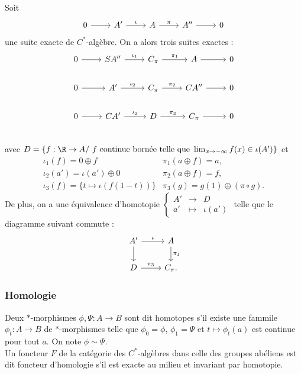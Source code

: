 \begin{lem}
Soit \[\begin{tikzcd}
0\arrow{r} & A' \arrow{r}{\iota} & A \arrow{r}{\pi} & A'' \arrow{r} & 0
\end{tikzcd}\]
une suite exacte de $C^*$-algèbre. On a alors trois suites exactes :
\[\begin{tikzcd}
0\arrow{r} & SA'' \arrow{r}{\iota_1} & C_\pi \arrow{r}{\pi_1} & A \arrow{r} & 0 \\
0\arrow{r} & A' \arrow{r}{\iota_2} & C_\pi \arrow{r}{\pi_2} & CA'' \arrow{r} & 0\\
0\arrow{r} & CA' \arrow{r}{\iota_3} & D \arrow{r}{\pi_3} & C_\pi \arrow{r} & 0\\
\end{tikzcd}\]
avec $D=\{f:\R\rightarrow A /\ f  \text{ continue bornée telle que }\lim_{x\rightarrow -\infty} f (x) \in \iota ( A')\}$ et 
\begin{align*}
\iota_1(f)=0\oplus f & \pi_1(a\oplus f) = a ,\\
\iota_2(a')=\iota(a')\oplus 0 & \pi_2(a\oplus f )=f,\\
\iota_3(f) = \{t\mapsto \iota(f(1-t))\} & \pi_3(g)=g(1)\oplus (\pi\circ g ) .
\end{align*}
De plus, on a une équivalence d'homotopie $\left\{\begin{array}{ccc} A' &\rightarrow& D\\ a' &\mapsto &\iota(a')\end{array}\right.$ telle que le diagramme suivant commute :
\[\begin{tikzcd}A'\arrow{r}{\iota}\arrow{d} & A\arrow{d}{\pi_1}\\ D \arrow{r}{\pi_3} & C_\pi .\end{tikzcd}\]
\end{lem}

\subsubsection{Homologie}

\begin{definition}
Deux $*$-morphismes $\phi,\Psi : A\rightarrow B$ sont dit homotopes s'il existe une fammile $\phi_t : A\rightarrow B$ de $*$-morphismes telle que $\phi_0=\phi$, $\phi_1=\Psi$ et $t\mapsto \phi_t(a) $ est continue pour tout $a$. On note $\phi\sim\Psi$.\\
Un foncteur $F$ de la catégorie des $C^*$-algèbres dans celle des groupes abéliens est dit foncteur d'homologie s'il est exacte au milieu et invariant par homotopie.
\end{definition}

